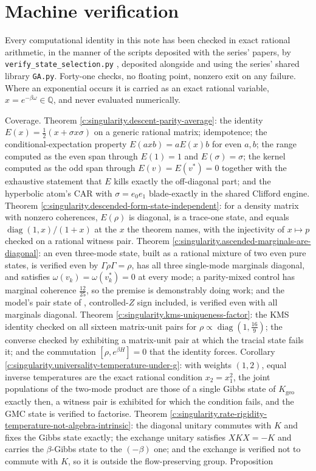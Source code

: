 \documentclass[11pt]{article}
\theoremstyle{definition}
\theoremstyle{plain}
\begin{document}
\section{Machine verification}

\label{c:note.state-selection.setting-machine-verification}
Every computational identity in this note has been checked in exact rational arithmetic, in the manner of the scripts deposited with the series' papers, by \texttt{verify\_state\_selection.py} \cite{ButlerVerifySS}, deposited alongside and using the series' shared library \texttt{GA.py}. Forty-one checks, no floating point, nonzero exit on any failure. Where an exponential occurs it is carried as an exact rational variable, $x = e^{-\beta\omega} \in \mathbb{Q}$, and never evaluated numerically.

Coverage. Theorem \ref{c:singularity.descent-parity-average}: the identity $E(x) = \tfrac12(x + \sigma x \sigma)$ on a generic rational matrix; idempotence; the conditional-expectation property $E(axb) = aE(x)b$ for even $a, b$; the range computed as the even span through $E(1) = 1$ and $E(\sigma) = \sigma$; the kernel computed as the odd span through $E(v) = E(v^{*}) = 0$ together with the exhaustive statement that $E$ kills exactly the off-diagonal part; and the hyperbolic atom's CAR with $\sigma = e_0e_1$ blade-exactly in the shared Clifford engine. Theorem \ref{c:singularity.descended-form-state-independent}: for a density matrix with nonzero coherences, $E(\rho)$ is diagonal, is a trace-one state, and equals $\operatorname{diag}(1, x)/(1+x)$ at the $x$ the theorem names, with the injectivity of $x \mapsto p$ checked on a rational witness pair. Theorem \ref{c:singularity.ascended-marginals-are-diagonal}: an even three-mode state, built as a rational mixture of two even pure states, is verified even by $\Gamma\rho\Gamma = \rho$, has all three single-mode marginals diagonal, and satisfies $\omega(v_k) = \omega(v_k^{*}) = 0$ at every mode; a parity-mixed control has marginal coherence $\tfrac{12}{25}$, so the premise is demonstrably doing work; and the model's pair state of \cite[\S 12]{ButlerT5}, controlled-$Z$ sign included, is verified even with all marginals diagonal. Theorem \ref{c:singularity.kms-uniqueness-factor}: the KMS identity checked on all sixteen matrix-unit pairs for $\rho \propto \operatorname{diag}(1, \tfrac{16}{9})$; the converse checked by exhibiting a matrix-unit pair at which the tracial state fails it; and the commutation $[\rho, e^{\beta H}] = 0$ that the identity forces. Corollary \ref{c:singularity.universality-temperature-under-g}: with weights $(1,2)$, equal inverse temperatures are the exact rational condition $x_2 = x_1^{2}$, the joint populations of the two-mode product are those of a single Gibbs state of $K_{\mathrm{geo}}$ exactly then, a witness pair is exhibited for which the condition fails, and the GMC state is verified to factorise. Theorem \ref{c:singularity.rate-rigidity-temperature-not-algebra-intrinsic}: the diagonal unitary commutes with $K$ and fixes the Gibbs state exactly; the exchange unitary satisfies $XKX = -K$ and carries the $\beta$-Gibbs state to the $(-\beta)$ one; and the exchange is verified not to commute with $K$, so it is outside the flow-preserving group. Proposition 
\end{document}
